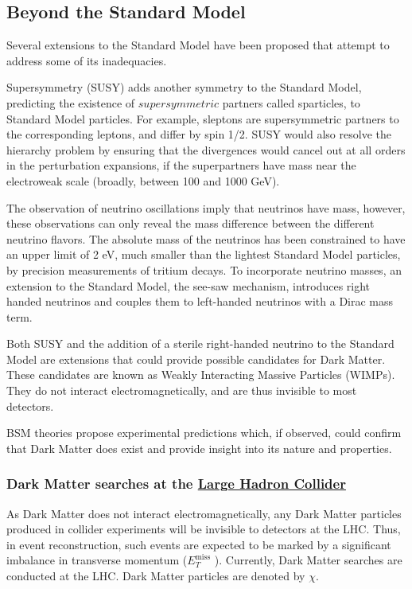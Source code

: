 \documentclass[12pt,a4paper,openright,twoside]{report}
\newcommand{\met}{$E_T^{\mathrm{miss}}$ }
\begin{document}
\subsection{Beyond the Standard Model}
Several extensions to the Standard Model have been proposed that attempt to address some of its inadequacies. 

Supersymmetry (SUSY) adds another symmetry to the Standard Model, predicting the existence of $supersymmetric$ partners called sparticles, to Standard Model particles. For example, sleptons are supersymmetric partners to the corresponding leptons, and differ by spin 1/2. SUSY would also resolve the hierarchy problem by ensuring that the divergences would cancel out at all orders in the perturbation expansions, if the superpartners have mass near the electroweak scale (broadly, between 100 and 1000 GeV).

The observation of neutrino oscillations imply that neutrinos have mass, however, these observations can only reveal the mass difference between the different neutrino flavors. The absolute mass of the neutrinos has been constrained to have an upper limit of 2 eV, much smaller than the lightest Standard Model particles, by precision measurements of tritium decays. To incorporate neutrino masses, an extension to the Standard Model, the see-saw mechanism, introduces right handed neutrinos and couples them to left-handed neutrinos with a Dirac mass term.

Both SUSY and the addition of a sterile right-handed neutrino to the Standard Model are extensions that could provide possible candidates for Dark Matter. These candidates are known as Weakly Interacting Massive Particles (WIMPs). They do not interact electromagnetically, and are thus invisible to most detectors.

BSM theories propose experimental predictions which, if observed, could confirm that Dark Matter does exist and provide insight into its nature and properties.

\subsubsection{Dark Matter searches at the \hyperref[ch:LHC]{Large Hadron Collider}}

As Dark Matter does not interact electromagnetically, any Dark Matter particles produced in collider experiments will be invisible to detectors at the LHC. Thus, in event reconstruction, such events are expected to be marked by a significant imbalance in transverse momentum (\met). Currently, Dark Matter searches are conducted at the LHC\cite{DM_searches}. Dark Matter particles are denoted by $\chi$.
\end{document}
